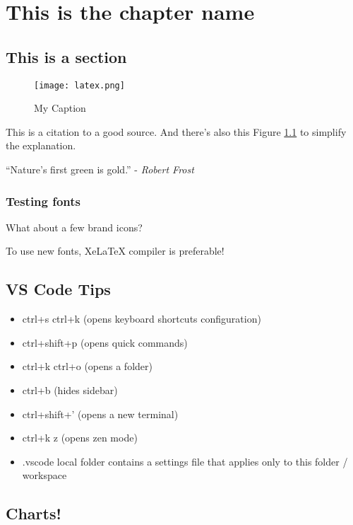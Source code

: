 
\chapter{This is the chapter name}
  
\vspace{1 cm}

\section{This is a section}
    
\begin{figure}[H]
    \centering
    \texttt{[image: latex.png]}
    \caption{My Caption}
    \label{alabel}
\end{figure}

This is a citation \cite{reference_name_3} to a good source. And there's also this Figure \ref{alabel} to simplify the explanation.

“Nature’s first {\color{mygreen} green} is gold.” - \textit{Robert Frost}

\subsection{Testing fonts}

What about a few brand icons? {\fontawesome{}\selectfont{}  }

\bigskip

{   
    \fontbadcomic 
    \fontsize{20pt}{24pt} \selectfont
    To use new fonts, XeLaTeX compiler is preferable!
}

\section{VS Code Tips}

\begin{itemize}
    \item ctrl+s ctrl+k (opens keyboard shortcuts configuration)
    \item ctrl+shift+p (opens quick commands)
    \item ctrl+k ctrl+o (opens a folder)
    \item ctrl+b (hides sidebar)
    \item ctrl+shift+' (opens a new terminal)
    \item ctrl+k z (opens zen mode)
    \item .vscode local folder contains a settings file that applies only to this folder / workspace
\end{itemize}

\section{Charts!}

